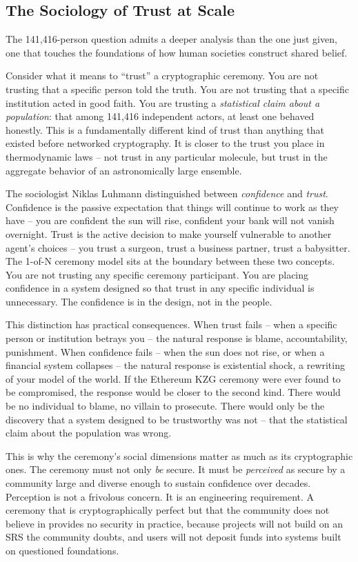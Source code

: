 \documentclass[
  11pt,
  openany]{report}
\begin{document}
\subsection{The Sociology of Trust at
Scale}\label{the-sociology-of-trust-at-scale}

The 141,416-person question admits a deeper analysis than the one just given,
one that touches the foundations of how human societies construct shared belief.

Consider what it means to ``trust'' a cryptographic ceremony. You are not
trusting that a specific person told the truth. You are not trusting that a
specific institution acted in good faith. You are trusting a \emph{statistical
claim about a population}: that among 141,416 independent actors, at least one
behaved honestly. This is a fundamentally different kind of trust than anything
that existed before networked cryptography. It is closer to the trust you place
in thermodynamic laws -- not trust in any particular molecule, but trust in the
aggregate behavior of an astronomically large ensemble.

The sociologist Niklas Luhmann distinguished between \emph{confidence} and
\emph{trust}. Confidence is the passive expectation that things will continue to
work as they have -- you are confident the sun will rise, confident your bank
will not vanish overnight. Trust is the active decision to make yourself
vulnerable to another agent's choices -- you trust a surgeon, trust a business
partner, trust a babysitter. The 1-of-N ceremony model sits at the boundary
between these two concepts. You are not trusting any specific ceremony
participant. You are placing confidence in a system designed so that trust in
any specific individual is unnecessary. The confidence is in the design, not in
the people.

This distinction has practical consequences. When trust fails -- when a specific
person or institution betrays you -- the natural response is blame,
accountability, punishment. When confidence fails -- when the sun does not rise,
or when a financial system collapses -- the natural response is existential
shock, a rewriting of your model of the world. If the Ethereum KZG ceremony were
ever found to be compromised, the response would be closer to the second kind.
There would be no individual to blame, no villain to prosecute. There would only
be the discovery that a system designed to be trustworthy was not -- that the
statistical claim about the population was wrong.

This is why the ceremony's social dimensions matter as much as its cryptographic
ones. The ceremony must not only \emph{be} secure. It must be \emph{perceived}
as secure by a community large and diverse enough to sustain confidence over
decades. Perception is not a frivolous concern. It is an engineering
requirement. A ceremony that is cryptographically perfect but that the community
does not believe in provides no security in practice, because projects will not
build on an SRS the community doubts, and users will not deposit funds into
systems built on questioned foundations.
\end{document}
